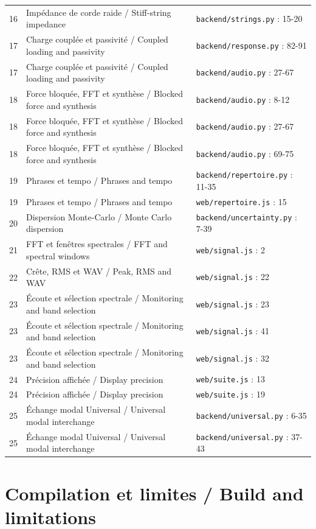 \documentclass[10pt,a4paper]{article}
\begin{document}
\begin{longtable}{p{8mm}p{75mm}p{65mm}}
16 & Impédance de corde raide / Stiff-string impedance & \texttt{backend/strings.py} : 15-20\\[3pt]
17 & Charge couplée et passivité / Coupled loading and passivity & \texttt{backend/response.py} : 82-91\\[3pt]
17 & Charge couplée et passivité / Coupled loading and passivity & \texttt{backend/audio.py} : 27-67\\[3pt]
18 & Force bloquée, FFT et synthèse / Blocked force and synthesis & \texttt{backend/audio.py} : 8-12\\[3pt]
18 & Force bloquée, FFT et synthèse / Blocked force and synthesis & \texttt{backend/audio.py} : 27-67\\[3pt]
18 & Force bloquée, FFT et synthèse / Blocked force and synthesis & \texttt{backend/audio.py} : 69-75\\[3pt]
19 & Phrases et tempo / Phrases and tempo & \texttt{backend/repertoire.py} : 11-35\\[3pt]
19 & Phrases et tempo / Phrases and tempo & \texttt{web/repertoire.js} : 15\\[3pt]
20 & Dispersion Monte-Carlo / Monte Carlo dispersion & \texttt{backend/uncertainty.py} : 7-39\\[3pt]
21 & FFT et fenêtres spectrales / FFT and spectral windows & \texttt{web/signal.js} : 2\\[3pt]
22 & Crête, RMS et WAV / Peak, RMS and WAV & \texttt{web/signal.js} : 22\\[3pt]
23 & Écoute et sélection spectrale / Monitoring and band selection & \texttt{web/signal.js} : 23\\[3pt]
23 & Écoute et sélection spectrale / Monitoring and band selection & \texttt{web/signal.js} : 41\\[3pt]
23 & Écoute et sélection spectrale / Monitoring and band selection & \texttt{web/signal.js} : 32\\[3pt]
24 & Précision affichée / Display precision & \texttt{web/suite.js} : 13\\[3pt]
24 & Précision affichée / Display precision & \texttt{web/suite.js} : 19\\[3pt]
25 & Échange modal Universal / Universal modal interchange & \texttt{backend/universal.py} : 6-35\\[3pt]
25 & Échange modal Universal / Universal modal interchange & \texttt{backend/universal.py} : 37-43\\[3pt]
\bottomrule\end{longtable}\normalsize
{}\section{Compilation et limites / Build and limitations}
\end{document}
